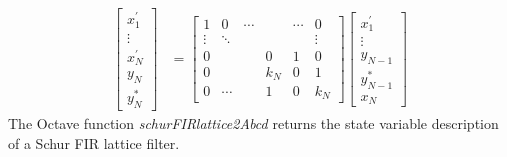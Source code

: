 \documentclass[a4paper,twoside,10pt,english]{report}
\begin{document}
\begin{align*}
\left[\begin{array}{c}
x_{1}^{\prime}\\
\vdots\\
x_{N}^{\prime}\\
y_{N}\\
y_{N}^{*}
\end{array}\right] & = \left[\begin{array}{cccccc}
1 & 0 & \cdots & & \cdots & 0\\
\vdots & \ddots & & & & \vdots \\
0 & & & 0 & 1 & 0\\
0 & & & k_{N} & 0 & 1\\
0 & \cdots & & 1 & 0 & k_{N}
\end{array}\right]\left[\begin{array}{c}
x_{1}^{\prime}\\
\vdots\\
y_{N-1}\\
y_{N-1}^{*}\\
x_{N}
\end{array}\right]
\end{align*}
The Octave function \emph{schurFIRlattice2Abcd} returns the state variable
description of a Schur FIR lattice filter.
\end{document}
